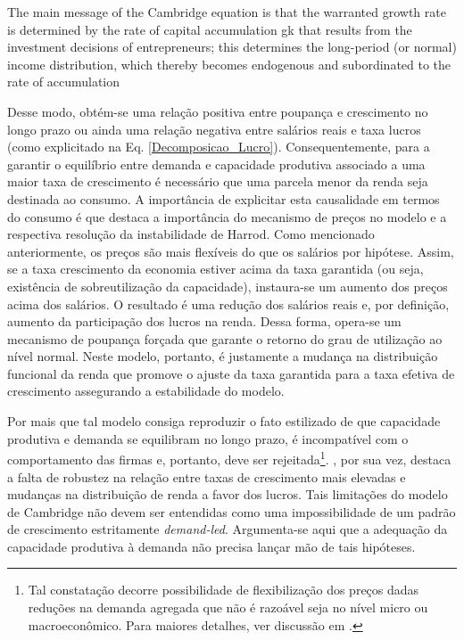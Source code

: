 \begin{citacao}
The main message of the Cambridge
equation is that the warranted growth rate is determined by the rate of capital
accumulation gk that results from the investment decisions of entrepreneurs; this
determines the long-period (or normal) income distribution, which thereby
becomes endogenous and subordinated to the rate of accumulation \cite[p.~158]{cesaratto_neo-kaleckian_2015}
\end{citacao}
Desse modo, obtém-se uma relação positiva entre poupança e crescimento no longo prazo ou ainda uma relação negativa entre salários reais e taxa lucros (como explicitado na Eq. \ref{Decomposicao_Lucro}). Consequentemente, para a garantir o equilíbrio entre demanda e capacidade produtiva associado a uma maior taxa de crescimento é necessário que uma parcela menor da renda seja destinada ao consumo. A importância de explicitar esta causalidade em termos do consumo é que destaca a importância do mecanismo de preços no modelo e a respectiva resolução da instabilidade de Harrod. Como mencionado anteriormente, os preços são mais flexíveis do que os salários por hipótese. Assim, se a taxa crescimento da economia estiver acima da taxa garantida (ou seja, existência de sobreutilização da capacidade), instaura-se um aumento dos preços acima dos salários. O resultado é uma redução dos salários reais e, por definição, aumento da participação dos lucros na renda. Dessa forma, opera-se um mecanismo de poupança forçada que garante o retorno do grau de utilização ao nível normal. Neste modelo, portanto, é justamente a mudança na distribuição funcional da renda que promove o ajuste da taxa garantida para a taxa efetiva de crescimento assegurando a estabilidade do modelo.

Por mais que tal modelo consiga reproduzir o fato estilizado de que capacidade produtiva e demanda se equilibram no longo prazo, é incompatível com o comportamento das firmas e, portanto, deve ser rejeitada\footnote{Tal constatação decorre possibilidade de flexibilização dos preços dadas reduções na demanda agregada que não é razoável seja no nível micro ou macroeconômico. Para maiores detalhes, ver discussão em \textcites[p.~104--5, n. 17]{serrano_teoria_1988}[Original de 1986]{ciccone_2017}.}. \textcite[p.~158]{cesaratto_neo-kaleckian_2015}, por sua vez, destaca a falta de robustez na relação entre taxas de crescimento mais elevadas e mudanças na distribuição de renda a favor dos lucros.
Tais limitações do modelo de Cambridge não devem ser entendidas como uma impossibilidade de um padrão de crescimento estritamente \textit{demand-led}. Argumenta-se aqui que a adequação da capacidade produtiva à demanda não precisa lançar mão de tais hipóteses. 

